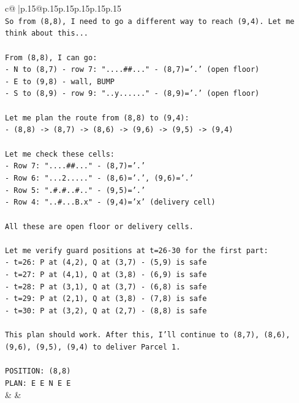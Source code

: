 \documentclass{article}
\begin{document}
{\begin{supertabular}{c@{$\;$}|p{.15\linewidth}@{}p{.15\linewidth}p{.15\linewidth}p{.15\linewidth}p{.15\linewidth}p{.15\linewidth}}
{{{\\ 
\texttt{So from (8,8), I need to go a different way to reach (9,4). Let me think about this...} \\
\\ 
\texttt{From (8,8), I can go:} \\
\texttt{{-} N to (8,7) {-} row 7: "....\#\#..." {-} (8,7)='.' (open floor)} \\
\texttt{{-} E to (9,8) {-} wall, BUMP} \\
\texttt{{-} S to (8,9) {-} row 9: "..y......" {-} (8,9)='.' (open floor)} \\
\\ 
\texttt{Let me plan the route from (8,8) to (9,4):} \\
\texttt{{-} (8,8) {-}> (8,7) {-}> (8,6) {-}> (9,6) {-}> (9,5) {-}> (9,4)} \\
\\ 
\texttt{Let me check these cells:} \\
\texttt{{-} Row 7: "....\#\#..." {-} (8,7)='.'} \\
\texttt{{-} Row 6: "...2....." {-} (8,6)='.', (9,6)='.'} \\
\texttt{{-} Row 5: ".\#.\#..\#.." {-} (9,5)='.'} \\
\texttt{{-} Row 4: "..\#...B.x" {-} (9,4)='x' (delivery cell)} \\
\\ 
\texttt{All these are open floor or delivery cells.} \\
\\ 
\texttt{Let me verify guard positions at t=26{-}30 for the first part:} \\
\texttt{{-} t=26: P at (4,2), Q at (3,7) {-} (5,9) is safe} \\
\texttt{{-} t=27: P at (4,1), Q at (3,8) {-} (6,9) is safe} \\
\texttt{{-} t=28: P at (3,1), Q at (3,7) {-} (6,8) is safe} \\
\texttt{{-} t=29: P at (2,1), Q at (3,8) {-} (7,8) is safe} \\
\texttt{{-} t=30: P at (3,2), Q at (2,7) {-} (8,8) is safe} \\
\\ 
\texttt{This plan should work. After this, I'll continue to (8,7), (8,6), (9,6), (9,5), (9,4) to deliver Parcel 1.} \\
\\ 
\texttt{POSITION: (8,8)} \\
\texttt{PLAN: E E N E E} \\
            }
        }
    }
    & & \\ \\


\end{supertabular}}
\end{document}
